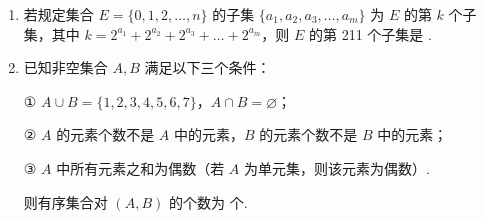 \documentclass[a4paper,11pt]{article}
\begin{document}
\begin{enumerate}
\fi
\item 若规定集合 $E=\{0,1,2,\dots,n\}$ 的子集 $\{a_1,a_2,a_3,\dots,a_m\}$ 为 $E$ 的第 $k$ 个子集，其中 $k=2^{a_1}+2^{a_2}+2^{a_3}+\dots+2^{a_m}$，则 $E$ 的第 211 个子集是 \blankline[2em].


\ifanswer
\solbegin
{}
\solend

\fi
\item 已知非空集合 $A,B$ 满足以下三个条件：

① $A\cup B=\{1,2,3,4,5,6,7\}$，$A\cap B=\varnothing$；

② $A$ 的元素个数不是 $A$ 中的元素，$B$ 的元素个数不是 $B$ 中的元素；

③ $A$ 中所有元素之和为偶数（若 $A$ 为单元集，则该元素为偶数）.

则有序集合对 $(A,B)$ 的个数为 \blankline 个.



\end{enumerate}
\end{document}

